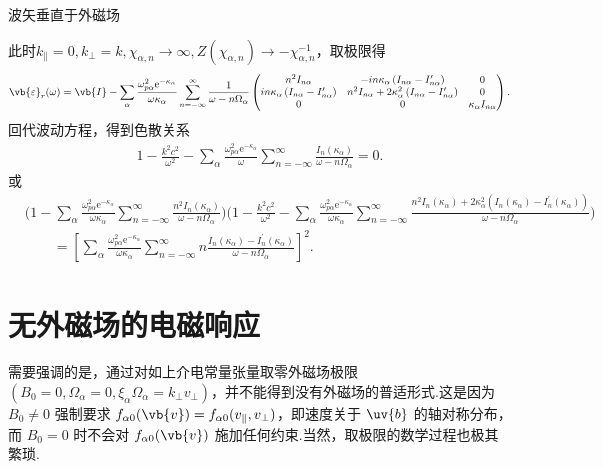 \begin{exbox}
	波矢垂直于外磁场

	此时\(k_{\parallel}=0, k_\perp=k, \chi_{\alpha,n}\to\infty, Z(\chi_{\alpha,n})\to-\chi_{\alpha,n}^{-1}\)，取极限得
	\begin{align*}
		\vb{\varepsilon}_r(\omega) = \vb{I} - \sum_\alpha\frac{\omega_{p\alpha}^2\mathrm{e}^{-\kappa_\alpha}}{\omega\kappa_\alpha}
		\sum_{n=-\infty}^{\infty}\frac{1}{\omega-n\Omega_\alpha}
		\begin{pmatrix}
			n^2I_{n\alpha}                                             & -in\kappa_\alpha\left(I_{n\alpha}-I_{n\alpha}^\prime\right)                & 0                         \\
			in\kappa_\alpha\left(I_{n\alpha}-I_{n\alpha}^\prime\right) & n^2I_{n\alpha}+2\kappa_\alpha^2\left(I_{n\alpha}-I_{n\alpha}^\prime\right) & 0                         \\
			0                                                          & 0                                                                          & \kappa_\alpha I_{n\alpha}
		\end{pmatrix}.
	\end{align*}
	回代波动方程，得到色散关系
	\begin{align*}
		1 - \frac{k^2c^2}{\omega^2} - \sum_\alpha\frac{\omega_{p\alpha}^2\mathrm{e}^{-\kappa_\alpha}}{\omega}\sum_{n=-\infty}^{\infty}\frac{I_n(\kappa_\alpha)}{\omega-n\Omega_\alpha} = 0.
	\end{align*}
	或
	\begin{align*}
		&\Bigg(1 - \sum_\alpha\frac{\omega_{p\alpha}^2\mathrm{e}^{-\kappa_\alpha}}{\omega\kappa_\alpha}\sum_{n=-\infty}^{\infty}\frac{n^2I_n(\kappa_\alpha)}{\omega-n\Omega_\alpha}\Bigg)
		\Bigg(1 - \frac{k^2c^2}{\omega^2} - \sum_\alpha\frac{\omega_{p\alpha}^2\mathrm{e}^{-\kappa_\alpha}}{\omega\kappa_\alpha}\sum_{n=-\infty}^{\infty}\frac{n^2I_n(\kappa_\alpha)+2\kappa_\alpha^2\left(I_n(\kappa_\alpha)-I_n^\prime(\kappa_\alpha)\right)}{\omega-n\Omega_\alpha}\Bigg)\\
		&\qquad= \left[\sum_\alpha\frac{\omega_{p\alpha}^2\mathrm{e}^{-\kappa_\alpha}}{\omega\kappa_\alpha}\sum_{n=-\infty}^{\infty}n\frac{I_n(\kappa_\alpha)-I_n^\prime(\kappa_\alpha)}{\omega-n\Omega_\alpha}\right]^2.
	\end{align*}
\end{exbox}

\section{无外磁场的电磁响应}
需要强调的是，通过对如上介电常量张量取零外磁场极限 \(\left(B_0=0,\Omega_\alpha=0,\xi_\alpha\Omega_\alpha=k_\perp v_\perp\right)\)，并不能得到没有外磁场的普适形式.这是因为 \(B_0\neq0\) 强制要求 \(f_{\alpha0}(\vb{v})=f_{\alpha0}(v_{\parallel},v_\perp)\)，即速度关于 \(\uv{b}\) 的轴对称分布，而 \(B_0=0\) 时不会对 \(f_{\alpha0}(\vb{v})\) 施加任何约束.当然，取极限的数学过程也极其繁琐.

